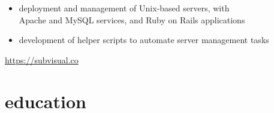\documentclass[a4paper]{friggeri-cv}
\begin{document}
\begin{entrylist}
{        \begin{itemize}
            \item deployment and management of Unix-based
            servers, with\\
            Apache and MySQL services, and Ruby on Rails applications
            \item development of helper scripts to automate
            server management tasks
            \end{itemize}
        \url{https://subvisual.co}
    }
\end{entrylist}

\newpage
\section{education}
\label{education}
\end{document}
